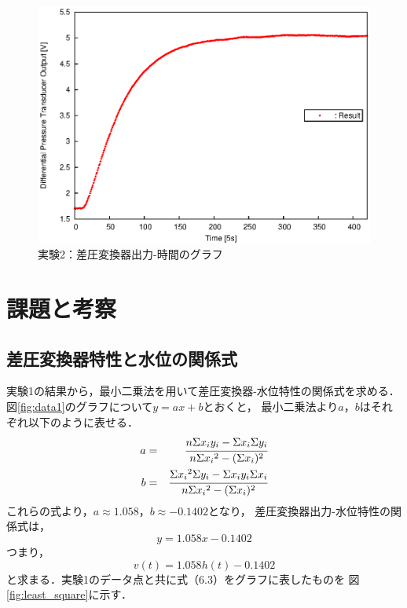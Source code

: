 \documentclass[11pt,a4paper]{jsarticle}
\begin{document}
    \begin{figure}[H]
      \begin{center}
        \includegraphics[width=0.9\hsize]{./fig/data2dpt.eps}
      \end{center}
      \caption{実験2：差圧変換器出力-時間のグラフ}
      \label{fig:data2dpt}
    \end{figure}

\section{課題と考察}
  \setcounter{equation}{0}
  \setcounter{figure}{0}
  \setcounter{table}{0}

  \subsection{差圧変換器特性と水位の関係式}
    実験1の結果から，最小二乗法を用いて差圧変換器-水位特性の関係式を求める．
    図\ref{fig:data1}のグラフについて$y = a x + b$とおくと，
    最小二乗法より$a$，$b$はそれぞれ以下のように表せる．
    \begin{eqnarray}
      a &=& \cfrac{n \Sigma x_i y_i - \Sigma x_i \Sigma y_i}
                  {n \Sigma {x_i}^2 - ( \Sigma x_i )^2} \\
      \vspace{5mm}
      b &=& \cfrac{\Sigma {x_i}^2 \Sigma y_i - \Sigma x_i y_i \Sigma x_i}
                  {n \Sigma {x_i}^2 - ( \Sigma x_i )^2}
    \end{eqnarray}
    これらの式より，$a \approx 1.058 $，$b \approx -0.1402$となり，
    差圧変換器出力-水位特性の関係式は，
    \begin{equation}
      y = 1.058 x - 0.1402
    \end{equation}
    つまり，
    \begin{equation}
      v(t) = 1.058 h(t) - 0.1402
    \end{equation}
    と求まる．実験1のデータ点と共に式（6.3）をグラフに表したものを
    図\ref{fig:least_square}に示す．\\
\end{document}
